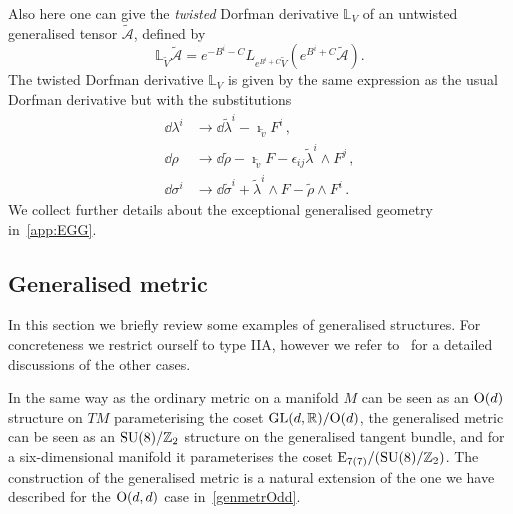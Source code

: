 \documentclass[debug]{phd}
\begin{document}
						Also here one can give the \emph{twisted} Dorfman derivative $\mathbb{L}_{V}$ of an untwisted generalised tensor $\tilde{\mathcal{A}}$, defined by
								\begin{equation}\label{eq:IIB_twisted_dorf}
									\mathbb{L}_{\tilde{V}}\tilde{\mathcal{A}}=e^{-B^{i}-C}L_{e^{B^{i}+C}\tilde{V}}(e^{B^{i}+C}\tilde{\mathcal{A}}).
								\end{equation}
						The twisted Dorfman derivative $\mathbb{L}_{V}$ is given by the same expression as the usual Dorfman derivative but with the substitutions
								\begin{equation}
									\begin{split}
										\dd\lambda^{i}	&\rightarrow	\dd\tilde{\lambda}^{i}-\imath_{\tilde{v}}F^{i} \, , \\
										\dd\rho		&\rightarrow	\dd\tilde{\rho}-\imath_{\tilde{v}}F-\epsilon_{ij}\tilde{\lambda}^{i}\wedge F^{j} \, , \\
										\dd\sigma^{i}	&\rightarrow	\dd\tilde{\sigma}^{i}+\tilde{\lambda}^{i}\wedge F-\tilde{\rho}\wedge F^{i} \, .
									\end{split}
								\end{equation}
						We collect further details about the exceptional generalised geometry in~\cref{app:EGG}.
			\subsection{Generalised metric}\label{gen_frame_metric}
					In this section we briefly review some examples of generalised structures.
					For concreteness we restrict ourself to type IIA, however we refer to~\cite{waldram4, AshmoreECY} for a detailed discussions of the other cases.
					
					In the same way as the ordinary metric on a manifold $M$ can be seen as an $\mathrm{O}(d)$ structure on $T M$ parameterising the coset $\mathrm{GL}(d,\mathbb{R})/\mathrm{O}(d)$, the generalised metric can be seen as an $\mathrm{SU}(8) / \mathbb{Z}_2$ structure on the generalised tangent bundle, and for a six-dimensional manifold it parameterises the coset $\mathrm{E}_{7(7)}/(\mathrm{SU}(8) / \mathbb{Z}_2)$. 
					The construction of the generalised metric is a natural extension of the one we have described for the $\mathrm{O}(d,d)$ case in~\cref{genmetrOdd}.
					
\end{document}
